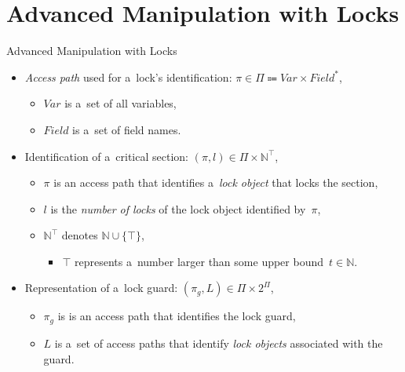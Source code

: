 \documentclass[10pt, xcolor=pdflatex, hyperref={unicode}, aspectratio=169]{beamer}
\begin{document}
\section{Advanced Manipulation with Locks}
\begin{frame}{Advanced Manipulation with Locks}
    \begin{itemize}\setlength\itemsep{1.5em}
        \item \emph{Access path} used for a~\alert{lock's identification}: $ \pi \in \Pi \Coloneqq Var \times Field^* $,
            \smallskip
            \begin{itemize}\setlength\itemsep{.8em}
                \item $ Var $ is a~set of all variables,

                \item $ Field $ is a~set of field names.
            \end{itemize}

        \item Identification of a~\alert{critical section}: $ (\pi, l) \in \Pi \times \mathbb{N}^\top $,
            \smallskip
            \begin{itemize}\setlength\itemsep{.8em}
                \item $ \pi $ is an access path that identifies a~\emph{lock object} that locks the section,

                \item $ l $ is the \emph{number of locks} of the lock object identified by~$ \pi $,

                \item $ \mathbb{N}^\top $ denotes $ \mathbb{N} \cup \{\top\} $,
                    \smallskip
                    \begin{itemize}
                        \item $ \top $ represents a~number larger than some \alert{upper bound}~$ t \in \mathbb{N} $.
                    \end{itemize}
            \end{itemize}

        \item Representation of a~\alert{lock guard}: $ (\pi_g, L) \in \Pi \times 2^\Pi $,
            \smallskip
            \begin{itemize}\setlength\itemsep{.8em}
                \item $ \pi_g $ is is an access path that identifies the lock guard,

                \item $ L $ is a~set of access paths that identify \emph{lock objects} associated with the guard.
            \end{itemize}
    \end{itemize}
\end{frame}


\end{document}
